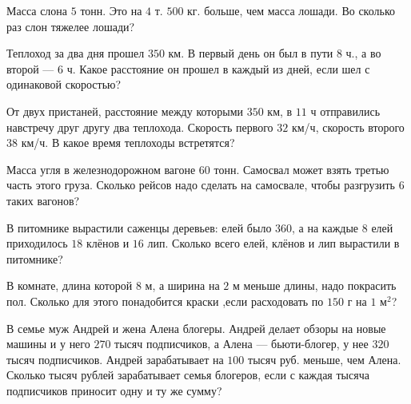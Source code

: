 \begin{listofex}
	\item Масса слона \( 5 \) тонн. Это на \( 4 \) т. \( 500 \) кг. больше, чем масса лошади. Во сколько раз слон тяжелее лошади?
	\item Теплоход за два дня прошел \( 350 \) км. В первый день он был в пути \( 8 \) ч., а во второй --- \( 6 \) ч. Какое расстояние он прошел в каждый из дней, если шел с одинаковой скоростью?
	\item От двух пристаней, расстояние между которыми \( 350 \) км, в \( 11 \) ч отправились навстречу друг другу два теплохода. Скорость первого \( 32 \) км/ч, скорость второго \( 38 \) км/ч. В какое время теплоходы встретятся?
	\item Масса угля в железнодорожном вагоне \( 60 \) тонн. Самосвал может взять третью часть этого груза. Сколько рейсов надо сделать на самосвале, чтобы разгрузить \( 6 \) таких вагонов?
	\item В питомнике вырастили саженцы деревьев: елей было \( 360 \), а на каждые \( 8 \) елей приходилось \( 18 \) клёнов и \( 16 \) лип. Сколько всего елей, клёнов и лип вырастили в питомнике?
	\item В комнате, длина которой \( 8 \) м, а ширина на \( 2 \) м меньше длины, надо покрасить пол. Сколько для этого понадобится краски ,если расходовать по \( 150 \) г на \( 1 \) м\( ^2 \)?
	\item В семье муж Андрей и жена Алена блогеры. Андрей делает обзоры на новые машины и у него \( 270 \) тысяч подписчиков, а Алена --- бьюти-блогер, у нее \( 320 \) тысяч подписчиков. Андрей зарабатывает на \( 100 \) тысяч руб. меньше, чем Алена. Сколько тысяч рублей зарабатывает семья блогеров, если с каждая тысяча подписчиков приносит одну и ту же сумму?
\end{listofex}